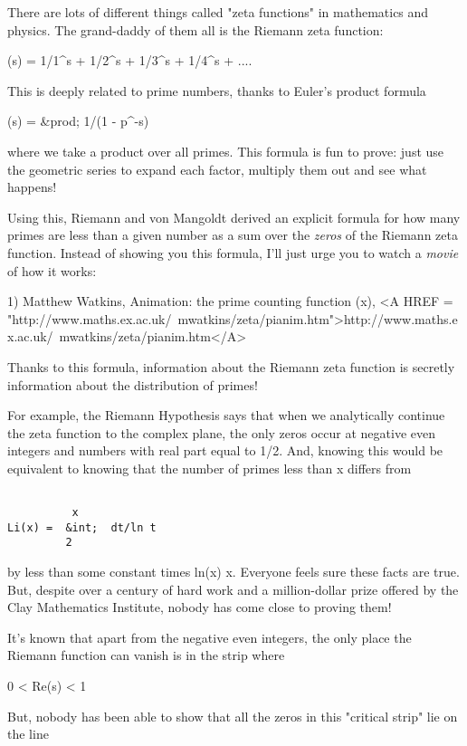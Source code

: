 


There are lots of different things called "zeta functions" 
in mathematics 
and physics.  The grand-daddy of them all is the Riemann zeta function:

\zeta (s) = 1/1^{s} + 1/2^{s} + 1/3^{s} + 1/4^{s} + ....

This is deeply related to prime numbers, thanks to Euler's product formula

\zeta (s) = &prod; 1/(1 - p^{-s})

where we take a product over all primes.  This formula is fun to prove: 
just use the geometric series to expand each factor, multiply them out 
and see what happens!

Using this, Riemann and von Mangoldt derived an explicit formula 
for how many primes are less than a given number as a sum over the 
\emph{zeros} of the Riemann zeta function.   Instead of showing you 
this formula, I'll just urge you to watch a \emph{movie} of how it works:

1) Matthew Watkins, Animation: the prime counting function
\pi (x), <A HREF = "http://www.maths.ex.ac.uk/~mwatkins/zeta/pianim.htm">http://www.maths.ex.ac.uk/~mwatkins/zeta/pianim.htm</A>  

Thanks to this formula, information about the Riemann zeta function 
is secretly information about the distribution of primes!  

For example, the Riemann Hypothesis says that when we analytically 
continue the zeta function to the complex plane, the only zeros occur 
at negative even integers and numbers with real part equal to 1/2.
And, knowing this would be equivalent to knowing that the number of 
primes less than x differs from

\begin{verbatim}

          x
Li(x) =  &int;  dt/ln t  
         2
\end{verbatim}
    
by less than some constant times ln(x) \sqrt x.  
Everyone feels
sure these facts are true.  But, despite over a century of hard work 
and a million-dollar prize offered by the Clay Mathematics Institute,
nobody has come close to proving them!

It's known that apart from the negative even integers, the only 
place the Riemann \zeta  function can vanish is in the strip where

0 < Re(s) < 1

But, nobody has been able to show that all the zeros in this 
"critical strip" lie on the line 

